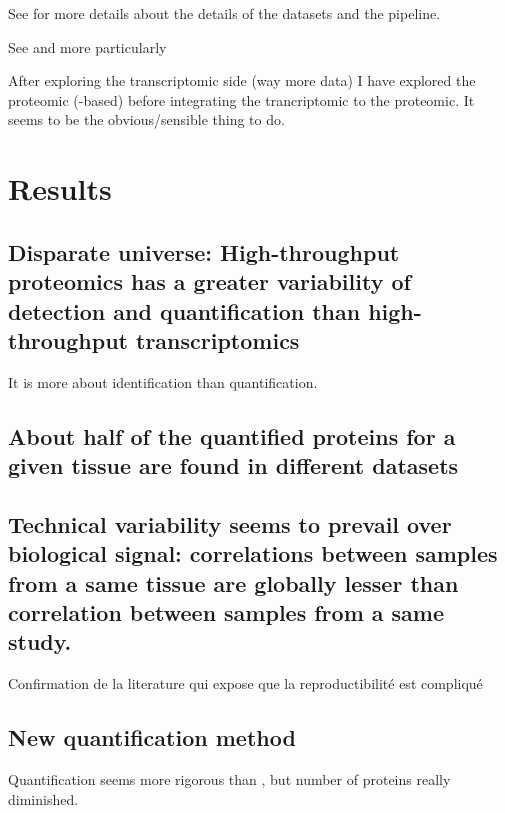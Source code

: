 See  for more details about the details of the datasets and
the pipeline.

See  and more particularly 

After exploring the transcriptomic side (way more data) I have explored the
proteomic (\ms-based) before integrating the trancriptomic to the proteomic.
It seems to be the obvious/sensible thing to do.


\section{Results}


\subsection{Disparate universe: High-throughput proteomics has a greater
variability of detection and quantification than high-throughput transcriptomics}

It is more about identification than quantification.

\subsection{About half of the quantified proteins for a given tissue are found
in different datasets}

\subsection{Technical variability seems to prevail over biological signal:
correlations between samples from a same tissue are globally lesser than
correlation between samples from a same study.}
Confirmation de la literature qui expose que la reproductibilité est compliqué


\subsection{New quantification method}

Quantification seems more rigorous than \citet{PandeyData},
but number of proteins really diminished.


